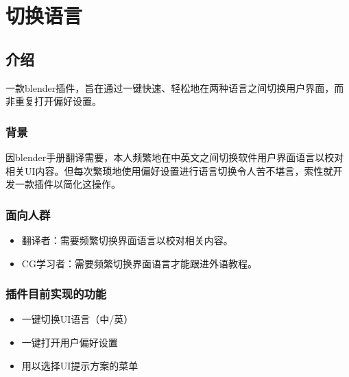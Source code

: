 \documentclass{../../PublicResources/DocClass}
\begin{document}
    \maketitle
    \frontmatter
    \clearpage
    
    \clearpage
    {\centering \tableofcontents} %
    \mainmatter

    \chapter{切换语言}
    \section{介绍}
    一款blender插件，旨在通过一键快速、轻松地在两种语言之间切换用户界面，而非重复打开偏好设置。

    \subsection{背景}
    因blender手册翻译需要，本人频繁地在中英文之间切换软件用户界面语言以校对相关UI内容。但每次繁琐地使用偏好设置进行语言切换令人苦不堪言，索性就开发一款插件以简化这操作。

    \subsection{面向人群}
    \begin{itemize}
        \item 翻译者：需要频繁切换界面语言以校对相关内容。
        \item CG学习者：需要频繁切换界面语言才能跟进外语教程。
    \end{itemize}

    \subsection{插件目前实现的功能}
    \begin{itemize}
        \item 一键切换UI语言（中/英）
        \item 一键打开用户偏好设置
        \item 用以选择UI提示方案的菜单
    \end{itemize}
\end{document}
